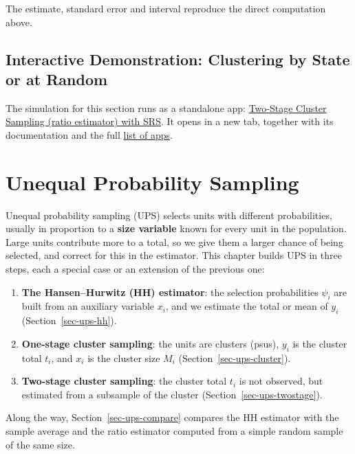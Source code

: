 \documentclass[
  letterpaper,
  DIV=11,
  numbers=noendperiod]{scrreprt}
\providecommand{\tightlist}{%
  \setlength{\itemsep}{0pt}\setlength{\parskip}{0pt}}
\renewcommand{\[}{\begin{equation}}
\renewcommand{\]}{\end{equation}}
\begin{document}
The estimate, standard error and interval reproduce the direct
computation above.

\section{Interactive Demonstration: Clustering by State or at
Random}\label{sec-app-cluster}

The simulation for this section runs as a standalone app:
\href{../shinylives_sampling/app-cluster.html}{Two-Stage Cluster
Sampling (ratio estimator) with SRS}. It opens in a new tab, together
with its documentation and the full
\href{../shinylives_sampling/index.html}{list of apps}.


\chapter{Unequal Probability
Sampling}\label{unequal-probability-sampling}

Unequal probability sampling (UPS) selects units with different
probabilities, usually in proportion to a \textbf{size variable} known
for every unit in the population. Large units contribute more to a
total, so we give them a larger chance of being selected, and correct
for this in the estimator. This chapter builds UPS in three steps, each
a special case or an extension of the previous one:

\begin{enumerate}
\def\labelenumi{\arabic{enumi}.}
\tightlist
\item
  \textbf{The Hansen--Hurwitz (HH) estimator}: the selection
  probabilities \(\psi_i\) are built from an auxiliary variable \(x_i\),
  and we estimate the total or mean of \(y_i\)
  (Section~\ref{sec-ups-hh}).
\item
  \textbf{One-stage cluster sampling}: the units are clusters (psus),
  \(y_i\) is the cluster total \(t_i\), and \(x_i\) is the cluster size
  \(M_i\) (Section~\ref{sec-ups-cluster}).
\item
  \textbf{Two-stage cluster sampling}: the cluster total \(t_i\) is not
  observed, but estimated from a subsample of the cluster
  (Section~\ref{sec-ups-twostage}).
\end{enumerate}

Along the way, Section~\ref{sec-ups-compare} compares the HH estimator
with the sample average and the ratio estimator computed from a simple
random sample of the same size.
\end{document}
